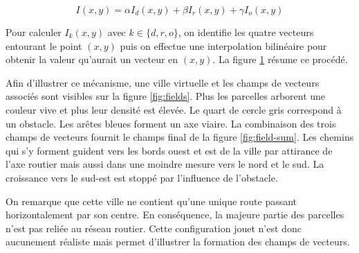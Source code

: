 \documentclass[12pt]{article}
\begin{document}
\begin{equation}
  I(x,y) = \alpha I_d(x,y) + \beta I_r(x,y) + \gamma I_o(x,y)
  \label{eq:vf}
\end{equation}

Pour calculer $I_k(x,y)$ avec $k \in \{d,r,o\}$, on identifie les
quatre vecteurs entourant le point $(x,y)$ puis on effectue une
interpolation bilinéaire pour obtenir la valeur qu'aurait un vecteur
en $(x,y)$. La figure \ref{fig:bilinear-interp} résume ce procédé.

\begin{figure}[H]
  \centering
  
  \caption{}
  \label{fig:bilinear-interp}
\end{figure}

Afin d'illustrer ce mécanisme, une ville virtuelle et les champs de
vecteurs associés sont visibles sur la figure \ref{fig:fields}. Plus
les parcelles arborent une couleur vive et plus leur densité est
élevée. Le quart de cercle gris correspond à un obstacle. Les arêtes
bleues forment un axe viaire. La combinaison des trois champs de
vecteurs fournit le champs final de la figure \ref{fig:field-sum}. Les
chemins qui s'y forment guident vers les bords ouest et est de la
ville par attirance de l'axe routier mais aussi dans une moindre
mesure vers le nord et le sud. La croissance vers le sud-est est
stoppé par l'influence de l'obstacle.

On remarque que cette ville ne contient qu'une unique route passant
horizontalement par son centre. En conséquence, la majeure partie des
parcelles n'est pas reliée au réseau routier. Cette configuration
jouet n'est donc aucunement réaliste mais permet d'illustrer la
formation des champs de vecteurs.
\end{document}

